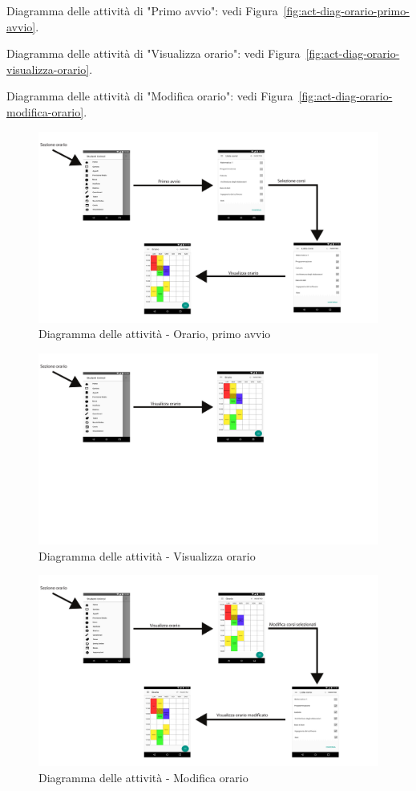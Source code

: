 Diagramma delle attività di "Primo avvio": vedi Figura~\vref{fig:act-diag-orario-primo-avvio}.

Diagramma delle attività di "Visualizza orario": vedi Figura~\vref{fig:act-diag-orario-visualizza-orario}.

Diagramma delle attività di "Modifica orario": vedi Figura~\vref{fig:act-diag-orario-modifica-orario}.

\begin{figure}
	\centering
	\includegraphics[width=\textwidth]{imgs/gruppo2/activity-orario-primo-avvio}
	\caption{Diagramma delle attività - Orario, primo avvio}
	\label{fig:act-diag-orario-primo-avvio}
\end{figure}

\begin{figure}
	\centering
	\includegraphics[width=\textwidth]{imgs/gruppo2/activity-orario-visualizza-orario}
	\caption{Diagramma delle attività - Visualizza orario}
	\label{fig:act-diag-orario-visualizza-orario}
\end{figure}

\begin{figure}
	\centering
	\includegraphics[width=\textwidth]{imgs/gruppo2/activity-orario-modifica-orario}
	\caption{Diagramma delle attività - Modifica orario}
	\label{fig:act-diag-orario-modifica-orario}
\end{figure}

\clearpage